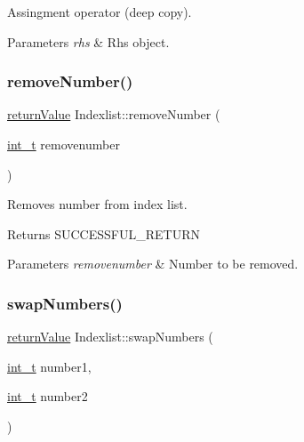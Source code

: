 Assingment operator (deep copy). 
\begin{DoxyParams}{Parameters}
{\em rhs} & Rhs object. \\
\hline
\end{DoxyParams}
\mbox{\label{class_indexlist_a16777f1e0828b13243b32142f1f7a1ce}} 
\subsubsection{\texorpdfstring{remove\+Number()}{removeNumber()}}
{\footnotesize\ttfamily \hyperlink{_message_handling_8hpp_a81d556f613bfbabd0b1f9488c0fa865e}{return\+Value} Indexlist\+::remove\+Number (\begin{DoxyParamCaption}\item[{\hyperlink{_types_8hpp_ab6fd6105e64ed14a0c9281326f05e623}{int\+\_\+t}}]{removenumber }\end{DoxyParamCaption})}

Removes number from index list. \begin{DoxyReturn}{Returns}
S\+U\+C\+C\+E\+S\+S\+F\+U\+L\+\_\+\+R\+E\+T\+U\+RN 
\end{DoxyReturn}

\begin{DoxyParams}{Parameters}
{\em removenumber} & Number to be removed. \\
\hline
\end{DoxyParams}
\mbox{\label{class_indexlist_a8affe558d7e73de524978b9d153a17f4}} 
\subsubsection{\texorpdfstring{swap\+Numbers()}{swapNumbers()}}
{\footnotesize\ttfamily \hyperlink{_message_handling_8hpp_a81d556f613bfbabd0b1f9488c0fa865e}{return\+Value} Indexlist\+::swap\+Numbers (\begin{DoxyParamCaption}\item[{\hyperlink{_types_8hpp_ab6fd6105e64ed14a0c9281326f05e623}{int\+\_\+t}}]{number1,  }\item[{\hyperlink{_types_8hpp_ab6fd6105e64ed14a0c9281326f05e623}{int\+\_\+t}}]{number2 }\end{DoxyParamCaption})}

